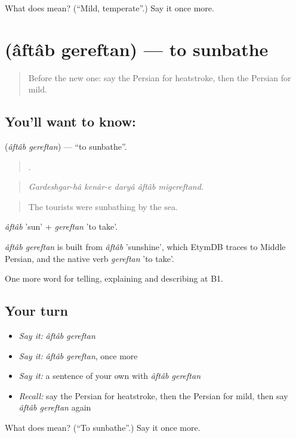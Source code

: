 \begin{tcolorbox}[breakable,colback=teal!4,colframe=teal!35!black,title={Before you move on}]
What does  mean? (\textquotedblleft{}Mild, temperate\textquotedblright{}.) Say it once more.
\end{tcolorbox}
\section[\texorpdfstring{\fa{آفتاب} \fa{گرفتن} (âftâb gereftan)}{آفتاب گرفتن (âftâb gereftan)}]{  (âftâb gereftan) — to sunbathe}

\label{lesson:FA-C477-aftab-gereftan}



\begin{quote}
Before the new one: say the Persian for heatstroke, then the Persian for mild.
\end{quote}

\subsection*{You'll want to know:  }
\textbf{ } (\emph{âftâb gereftan}) — \textquotedblleft{}to sunbathe\textquotedblright{}.

\begin{quote}
    .
\end{quote}

\begin{quote}
\emph{Gardeshgar-hâ kenâr-e daryâ âftâb migereftand.}
\end{quote}

\begin{quote}
The tourists were sunbathing by the sea.
\end{quote}

\emph{âftâb} 'sun' + \emph{gereftan} 'to take'.

\begin{cousinweb}
\emph{âftâb gereftan} is built from \emph{âftâb} 'sunshine', which EtymDB traces to Middle Persian, and the native verb \emph{gereftan} 'to take'.
\end{cousinweb}

\begin{grammarlens}[title={What you've built}]
One more word for telling, explaining and describing at B1.
\end{grammarlens}

\subsection*{Your turn}
\begin{itemize}
\raggedright
  \item \emph{Say it:} \emph{âftâb gereftan}
  \item \emph{Say it:} \emph{âftâb gereftan}, once more
  \item \emph{Say it:} a sentence of your own with \emph{âftâb gereftan}
  \item \emph{Recall:} say the Persian for heatstroke, then the Persian for mild, then say \emph{âftâb gereftan} again
\end{itemize}

\begin{tcolorbox}[breakable,colback=teal!4,colframe=teal!35!black,title={Before you move on}]
What does   mean? (\textquotedblleft{}To sunbathe\textquotedblright{}.) Say it once more.
\end{tcolorbox}

